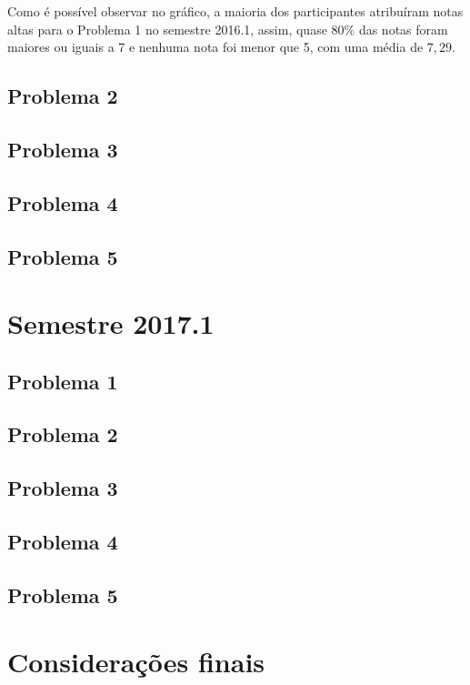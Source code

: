 Como é possível observar no gráfico, a maioria dos participantes atribuíram
notas altas para o Problema 1 no semestre 2016.1, assim, quase $80\%$ das notas
foram maiores ou iguais a 7 e nenhuma nota foi menor que 5, com uma média
de $7,29$.
  
\subsection{Problema 2}
\subsection{Problema 3}
\subsection{Problema 4}
\subsection{Problema 5}
\section{Semestre 2017.1}
\label{sec-sem-2017}
\subsection{Problema 1}
\subsection{Problema 2}
\subsection{Problema 3}
\subsection{Problema 4}
\subsection{Problema 5}
\section{Considerações finais}
\label{sec-consideracoes-resultados}
